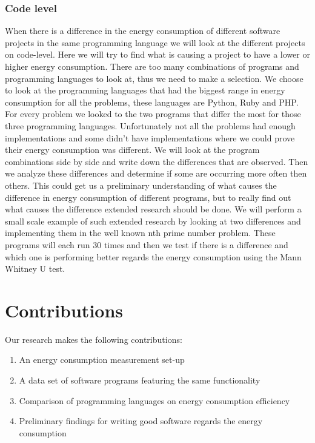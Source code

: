 \subsubsection{Code level}
When there is a difference in the energy consumption of different software projects in the same programming language we will look at the different projects on code-level. Here we will try to find what is causing a project to have a lower or higher energy consumption. There are too many combinations of programs and programming languages to look at, thus we need to make a selection. We choose to look at the programming languages that had the biggest range in energy consumption for all the problems, these languages are Python, Ruby and PHP. For every problem we looked to the two programs that differ the most for those three programming languages. Unfortunately not all the problems had enough implementations and some didn't have implementations where we could prove their energy consumption was different. We will look at the program combinations side by side and write down the differences that are observed. Then we analyze these differences and determine if some are occurring more often then others. This could get us a preliminary understanding of what causes the difference in energy consumption of different programs, but to really find out what causes the difference extended research should be done. We will perform a small scale example of such extended research by looking at two differences and implementing them in the well known nth prime number problem. These programs will each run 30 times and then we test if there is a difference and which one is performing better regards the energy consumption using the Mann Whitney U test.


\section{Contributions}
Our research makes the following contributions:
\begin{enumerate}
	\item An energy consumption measurement set-up
	\item A data set of software programs featuring the same functionality
	\item Comparison of programming languages on energy consumption efficiency
	\item Preliminary findings for writing good software regards the energy consumption
\end{enumerate}

